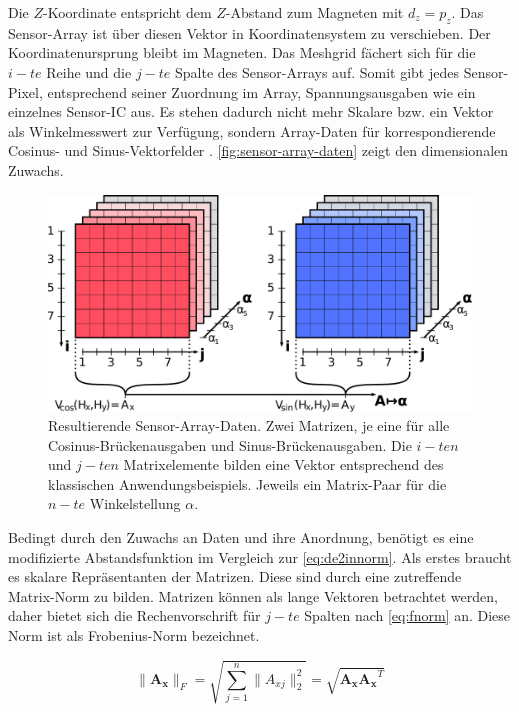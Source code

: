 Die  $Z$-Koordinate entspricht dem $Z$-Abstand zum Magneten mit $d_z = p_z$. Das Sensor-Array ist über diesen Vektor in Koordinatensystem zu verschieben. Der Koordinatenursprung bleibt im Magneten. Das Meshgrid fächert sich für die $i-te$ Reihe und die $j-te$ Spalte des Sensor-Arrays auf. Somit gibt jedes Sensor-Pixel, entsprechend seiner Zuordnung im Array, Spannungsausgaben wie ein einzelnes Sensor-IC aus. Es stehen dadurch nicht mehr Skalare bzw. ein Vektor als Winkelmesswert zur Verfügung, sondern Array-Daten für korrespondierende Cosinus- und Sinus-Vektorfelder \cite{Mehm2019}\cite{Schuethe2020}. \autoref{fig:sensor-array-daten} zeigt den dimensionalen Zuwachs. 


\vspace{5mm}
\begin{figure}[tph]
	\centering
	\includegraphics[width=0.9\linewidth]{chapters/images/2-Grundlagen/Sensor-Array-Daten}
	\caption[Resultierende Sensor-Array-Daten]{Resultierende Sensor-Array-Daten. Zwei Matrizen, je eine für alle Cosinus-Brückenausgaben und Sinus-Brückenausgaben. Die $i-ten$ und $j-ten$ Matrixelemente bilden eine Vektor entsprechend des klassischen Anwendungsbeispiels. Jeweils ein Matrix-Paar für die $n-te$ Winkelstellung $\alpha$.}
	\label{fig:sensor-array-daten}
\end{figure}


Bedingt durch den Zuwachs an Daten und ihre Anordnung, benötigt es eine modifizierte Abstandsfunktion \cite{Schuethe2020b}\cite{Schuethe2020} im Vergleich zur \autoref{eq:de2innorm}. Als erstes braucht es skalare Repräsentanten der Matrizen. Diese sind durch eine zutreffende Matrix-Norm zu bilden. Matrizen können als lange Vektoren betrachtet werden, daher bietet sich die Rechenvorschrift für $j-te$ Spalten nach \autoref{eq:fnorm} an. Diese Norm ist als Frobenius-Norm bezeichnet.


\begin{equation}\label{eq:fnorm}
\|\mathbf{A_x}\|_F= \sqrt{\sum_{j=1}^{n}\|A_{xj}\|_2^2} = \sqrt{\mathbf{A_x}\mathbf{A_x}^T}
\end{equation}


